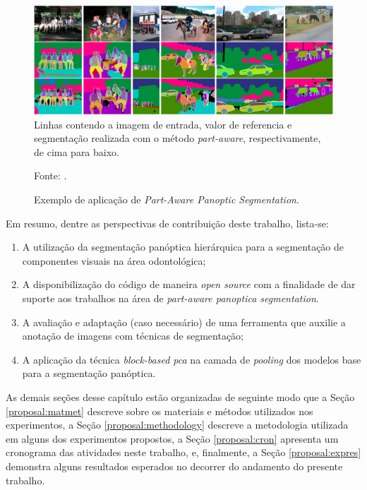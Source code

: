 \begin{figure}[H]
    \centering
    \caption{Exemplo de aplicação de \textit{Part-Aware Panoptic Segmentation}.}
    \includegraphics[width=1\linewidth]{recursos/imagens/proposal/part-aware-example.png}
    \label{proposal:proposal:fig:3}
    {\tiny Linhas contendo a imagem de entrada, valor de referencia e segmentação realizada com o método \textit{part-aware}, respectivamente, de cima para baixo.}

    \vspace*{1 cm}
    Fonte: \cite{DeGeus2021}.
\end{figure}

Em resumo, dentre as perspectivas de contribuição deste trabalho, lista-se:

\begin{enumerate}[I]
  \item A utilização da segmentação panóptica hierárquica para a segmentação de componentes visuais na área odontológica;
  \item A disponibilização do código de maneira \textit{open source} com a finalidade de dar suporte aos trabalhos na área de \textit{part-aware panoptica segmentation}.
  \item A avaliação e adaptação (caso necessário) de uma ferramenta que auxilie a anotação de imagens com técnicas de segmentação;
  \item A aplicação da técnica \textit{block-based pca} na camada de \textit{pooling} dos modelos base para a segmentação panóptica.
\end{enumerate}

As demais seções desse capítulo estão organizadas de seguinte modo que a Seção \ref{proposal:matmet} descreve sobre os materiais e métodos utilizados nos experimentos, a Seção \ref{proposal:methodology} descreve a metodologia utilizada em alguns dos experimentos propostos, a Seção \ref{proposal:cron} apresenta um cronograma das atividades neste trabalho, e, finalmente, a Seção \ref{proposal:expres} demonstra alguns resultados esperados no decorrer do andamento do presente trabalho.


